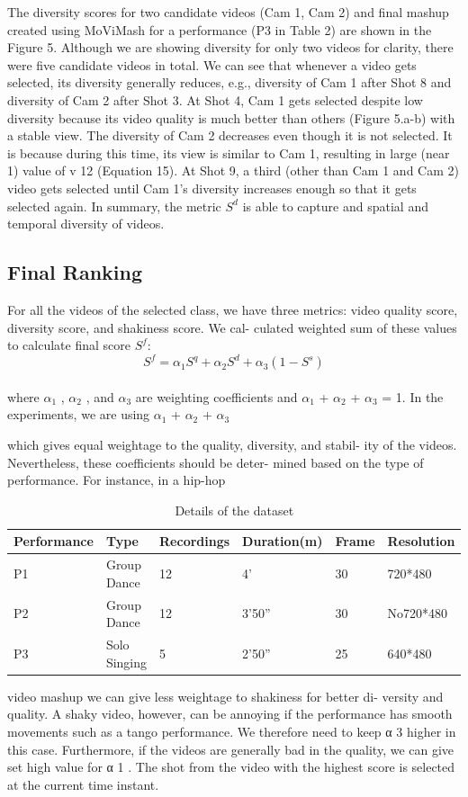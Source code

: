 \documentclass{sig-alternate}
\begin{document}
The diversity scores for two candidate videos (Cam 1, Cam 2)
and final mashup created using MoViMash for a performance (P3
in Table 2) are shown in the Figure 5. Although we are showing
diversity for only two videos for clarity, there were five candidate
videos in total. We can see that whenever a video gets selected,
its diversity generally reduces, e.g., diversity of Cam 1 after Shot 8
and diversity of Cam 2 after Shot 3. At Shot 4, Cam 1 gets selected
despite low diversity because its video quality is much better than
others (Figure 5.a-b) with a stable view. The diversity of Cam 2
decreases even though it is not selected. It is because during this
time, its view is similar to Cam 1, resulting in large (near 1) value
of v 12 (Equation 15). At Shot 9, a third (other than Cam 1 and Cam
2) video gets selected until Cam 1’s diversity increases enough so
that it gets selected again. In summary, the metric ${S^{d}}$ is able to
capture and spatial and temporal diversity of videos.

\subsection{Final Ranking}

For all the videos of the selected class, we have three metrics:
video quality score, diversity score, and shakiness score. We cal-
culated weighted sum of these values to calculate final score ${S^{f}}$:
\begin{equation}
S^f = \alpha_1 S^q + \alpha_2 S^d + \alpha_3 (1-S^s)
\end{equation}
\\
where $\alpha_1$ , $\alpha_2$ , and $\alpha_3$ are weighting coefficients and $\alpha_1$ + $\alpha_2$ +
$\alpha_3$ = 1. In the experiments, we are using $\alpha_1$ + $\alpha_2$ +
$\alpha_3$

which gives equal weightage to the quality, diversity, and stabil-
ity of the videos. Nevertheless, these coefficients should be deter-
mined based on the type of performance. For instance, in a hip-hop
\begin{table}
\centering
\fivept
\caption{Details of the dataset}
\begin{tabular}{p{1.5cm}|p{1cm}|p{1.5cm}|p{1cm}|p{1cm}|p{1cm}} \hline
Performance&Type&Recordings&Duration(m)&Frame&Resolution\\ \hline
P1 &Group Dance&12&4'&30&720*480\\ \hline
P2&Group Dance&12&3'50''&30&No720*480\\ \hline
P3&Solo Singing&5&2'50''&25&640*480\\ \hline
\end{tabular}
\end{table}
video mashup we can give less weightage to shakiness for better di-
versity and quality. A shaky video, however, can be annoying if the
performance has smooth movements such as a tango performance.
We therefore need to keep α 3 higher in this case. Furthermore, if
the videos are generally bad in the quality, we can give set high
value for α 1 . The shot from the video with the highest score is
selected at the current time instant.
\end{document}
